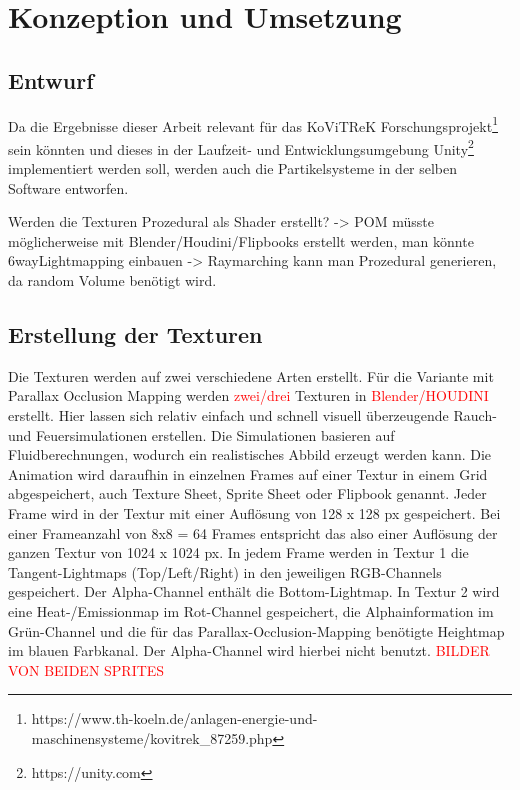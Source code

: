 \section{Konzeption und Umsetzung}
\label{sec:4}
\subsection{Entwurf}

Da die Ergebnisse dieser Arbeit relevant für das KoViTReK Forschungsprojekt\footnote{https://www.th-koeln.de/anlagen-energie-und-maschinensysteme/kovitrek\_87259.php}
sein könnten und dieses in der Laufzeit- und Entwicklungsumgebung Unity\footnote{https://unity.com}
implementiert werden soll, werden auch die Partikelsysteme in der selben Software entworfen.

Werden die Texturen Prozedural als Shader erstellt? \newline
-> POM müsste möglicherweise mit Blender/Houdini/Flipbooks erstellt werden, man könnte 6wayLightmapping einbauen\newline
-> Raymarching kann man Prozedural generieren, da random Volume benötigt wird.\newline



\subsection{Erstellung der Texturen}
\label{sec:4.1}

Die Texturen werden auf zwei verschiedene Arten erstellt. Für die Variante mit Parallax Occlusion Mapping werden \textcolor{red}{zwei/drei}
Texturen in \textcolor{red}{Blender/HOUDINI} erstellt. Hier lassen sich relativ einfach und schnell visuell überzeugende Rauch- und
Feuersimulationen erstellen. Die Simulationen basieren auf Fluidberechnungen, wodurch ein realistisches Abbild erzeugt werden kann.
Die Animation wird daraufhin in einzelnen Frames auf einer Textur in einem Grid abgespeichert, auch Texture Sheet, Sprite Sheet oder Flipbook genannt.
Jeder Frame wird in der Textur mit einer Auflösung von 128 x 128 px gespeichert. Bei einer Frameanzahl von 8x8 = 64 Frames entspricht das also
einer Auflösung der ganzen Textur von 1024 x 1024 px.
In jedem Frame werden in Textur 1 die Tangent-Lightmaps (Top/Left/Right) in den jeweiligen RGB-Channels gespeichert.
Der Alpha-Channel enthält die Bottom-Lightmap. In Textur 2 wird eine Heat-/Emissionmap im Rot-Channel gespeichert, die Alphainformation im
Grün-Channel und die für das Parallax-Occlusion-Mapping benötigte Heightmap im blauen Farbkanal. Der Alpha-Channel wird hierbei nicht benutzt.
\textcolor{red}{BILDER VON BEIDEN SPRITES}


